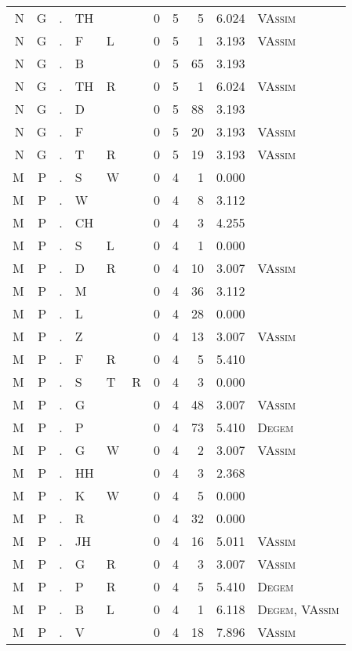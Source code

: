 \begin{longtable}{r@{ } r@{ } c@{ } l@{ } l@{ } l@{ } r r r r l }
N & G & . & TH &  &  & 0 & 5 & 5 & 6.024 & \textsc{VAssim} \\
N & G & . & F & L &  & 0 & 5 & 1 & 3.193 & \textsc{VAssim} \\
N & G & . & B &  &  & 0 & 5 & 65 & 3.193 &  \\
N & G & . & TH & R &  & 0 & 5 & 1 & 6.024 & \textsc{VAssim} \\
N & G & . & D &  &  & 0 & 5 & 88 & 3.193 &  \\
N & G & . & F &  &  & 0 & 5 & 20 & 3.193 & \textsc{VAssim} \\
N & G & . & T & R &  & 0 & 5 & 19 & 3.193 & \textsc{VAssim} \\
M & P & . & S & W &  & 0 & 4 & 1 & 0.000 &  \\
M & P & . & W &  &  & 0 & 4 & 8 & 3.112 &  \\
M & P & . & CH &  &  & 0 & 4 & 3 & 4.255 &  \\
M & P & . & S & L &  & 0 & 4 & 1 & 0.000 &  \\
M & P & . & D & R &  & 0 & 4 & 10 & 3.007 & \textsc{VAssim} \\
M & P & . & M &  &  & 0 & 4 & 36 & 3.112 &  \\
M & P & . & L &  &  & 0 & 4 & 28 & 0.000 &  \\
M & P & . & Z &  &  & 0 & 4 & 13 & 3.007 & \textsc{VAssim} \\
M & P & . & F & R &  & 0 & 4 & 5 & 5.410 &  \\
M & P & . & S & T & R & 0 & 4 & 3 & 0.000 &  \\
M & P & . & G &  &  & 0 & 4 & 48 & 3.007 & \textsc{VAssim} \\
M & P & . & P &  &  & 0 & 4 & 73 & 5.410 & \textsc{Degem} \\
M & P & . & G & W &  & 0 & 4 & 2 & 3.007 & \textsc{VAssim} \\
M & P & . & HH &  &  & 0 & 4 & 3 & 2.368 &  \\
M & P & . & K & W &  & 0 & 4 & 5 & 0.000 &  \\
M & P & . & R &  &  & 0 & 4 & 32 & 0.000 &  \\
M & P & . & JH &  &  & 0 & 4 & 16 & 5.011 & \textsc{VAssim} \\
M & P & . & G & R &  & 0 & 4 & 3 & 3.007 & \textsc{VAssim} \\
M & P & . & P & R &  & 0 & 4 & 5 & 5.410 & \textsc{Degem} \\
M & P & . & B & L &  & 0 & 4 & 1 & 6.118 & \textsc{Degem}, \textsc{VAssim} \\
M & P & . & V &  &  & 0 & 4 & 18 & 7.896 & \textsc{VAssim} \\

\end{longtable}
